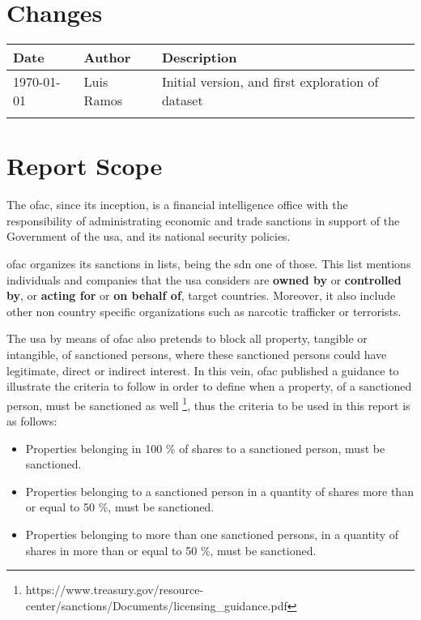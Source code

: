 \section{Changes}
\begin{tabular}{|m{3.0cm}|m{6.0cm}|m{6.0cm}|}
	\hline
	\textbf{Date} & \textbf{Author} & \textbf{Description}
	\tabularnewline
	\hline
	\today  & Luis Ramos &
	Initial version, and first exploration of dataset
    \tabularnewline
	\hline & &
	\tabularnewline
	\hline
\end{tabular}

\newpage
\section{Report Scope}\label{scope}
\begin{spacing}{1.5}

	The \gls{ofac}, since its inception, is a financial intelligence office with the responsibility of administrating economic and trade sanctions in support of the Government of the \gls{usa}, and its national security policies. 
	
	\gls{ofac} organizes its sanctions in lists, being the \gls{sdn} one of those. This list mentions individuals and companies that the \gls{usa} considers are \textbf{owned by} or \textbf{controlled by}, or \textbf{acting for} or \textbf{on behalf of}, target countries. Moreover, it also include other non country specific organizations such as narcotic trafficker or terrorists. 
	
	The \gls{usa} by means of \gls{ofac} also pretends to block all property, tangible or intangible, of sanctioned persons, where these sanctioned persons could have legitimate, direct or indirect interest.  In this vein, \gls{ofac} published a guidance to illustrate the criteria to follow in order to define when a property, of a sanctioned person, must be sanctioned as well \footnote{https://www.treasury.gov/resource-center/sanctions/Documents/licensing\_guidance.pdf}, thus the criteria to be used in this report is as follows:
	
	\begin{itemize}
		\item Properties belonging in 100 \% of shares to a sanctioned person, must be sanctioned. 
		\item Properties belonging to a sanctioned person in a quantity of shares more than or equal to 50 \%, must be sanctioned. 
		\item Properties belonging to more than one sanctioned persons, in a quantity of shares in more than or equal to 50 \%, must be sanctioned.
	\end{itemize}
	

\end{spacing}
